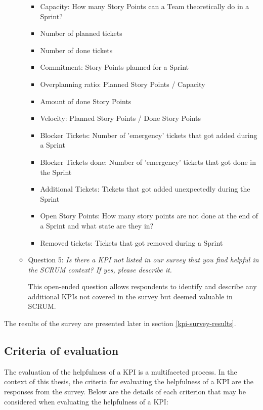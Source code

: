 \begin{itemize}
\begin{itemize}
        \begin{itemize}
            \item Capacity: How many Story Points can a Team theoretically do in a Sprint?
            \item Number of planned tickets
            \item Number of done tickets
            \item Commitment: Story Points planned for a Sprint
            \item Overplanning ratio: Planned Story Points / Capacity
            \item Amount of done Story Points
            \item Velocity: Planned Story Points / Done Story Points
            \item Blocker Tickets: Number of 'emergency' tickets that got added during a Sprint
            \item Blocker Tickets done: Number of 'emergency' tickets that got done in the Sprint
            \item Additional Tickets: Tickets that got added unexpectedly during the Sprint
            \item Open Story Points: How many story points are not done at the end of a Sprint and what state are they in?
            \item Removed tickets: Tickets that got removed during a Sprint
        \end{itemize}

        \item Question 5: \textit{Is there a KPI not listed in our survey that you find helpful in the SCRUM context? If yes, please describe it.}

        This open-ended question allows respondents to identify and describe any additional KPIs not covered in the survey but deemed valuable in SCRUM.
    \end{itemize}
\end{itemize}

The results of the survey are presented later in section \ref{kpi-survey-results}.

\subsection{Criteria of evaluation} \label{CriteriaKPIEvaluation}

The evaluation of the helpfulness of a KPI is a multifaceted process.
In the context of this thesis, 
the criteria for evaluating the helpfulness of a KPI are the responses from the survey.
Below are the details of each criterion that may be considered when evaluating the helpfulness of a KPI:

